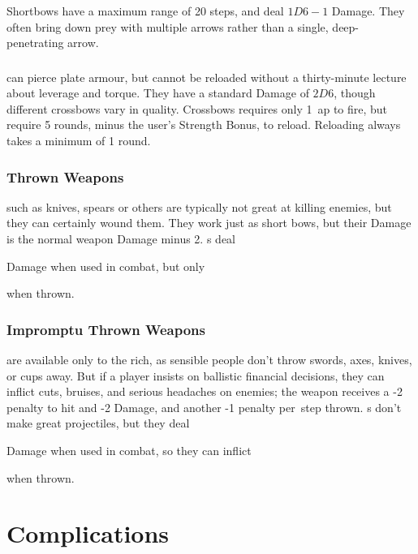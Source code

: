 \begin{multicols}{2}
Shortbows have a maximum range of 20 steps, and deal $1D6-1$ Damage.
They often bring down prey with multiple arrows rather than a single, deep-penetrating arrow.

\subsubsection{}
\label{crossbow}
can pierce plate armour, but cannot be reloaded without a thirty-minute lecture about leverage and torque.
They have a standard Damage of $2D6$, though different crossbows vary in quality.
Crossbows requires only 1~\gls{ap} to fire, but require 5 \glspl{round}, minus the user's Strength Bonus, to reload.
Reloading always takes a minimum of 1 \gls{round}.

\subsubsection{Thrown Weapons}
such as knives, spears or others are typically not great at killing enemies, but they can certainly wound them.
They work just as short bows, but their Damage is the normal weapon Damage minus 2.
\javelin\weaponName s deal
\addtocounter{weaponDamage}{4}
 Damage
when used in combat, but only
\addtocounter{weaponDamage}{-2}%
 when thrown.

\subsubsection{Impromptu Thrown Weapons}
are available only to the rich, as sensible people don't throw swords, axes, knives, or cups away.
But if a player insists on ballistic financial decisions, they can inflict cuts, bruises, and serious headaches on enemies; the weapon receives a -2 penalty to hit and -2 Damage, and another -1 penalty per~\gls{step} thrown.
\longsword\weaponName s don't make great projectiles, but they deal
\addtocounter{weaponDamage}{4}
 Damage
when used in combat, so they can inflict
\addtocounter{weaponDamage}{-2}%
 when thrown.

\end{multicols}

\projectilesChart

\startcontents[Manoeuvres]

\section{Complications}

